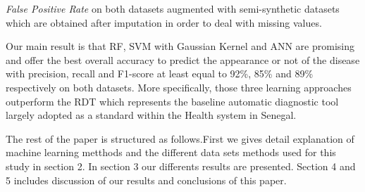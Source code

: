  \emph{False Positive Rate} on both datasets augmented with semi-synthetic datasets which are obtained after imputation in order to deal with missing values.
 
 Our main result is that RF, SVM  with Gaussian Kernel and ANN are promising and offer the best overall accuracy to predict the appearance or not of the disease with precision, recall and F1-score at least equal to 92\%, 85\% and 89\% respectively on both datasets. More specifically, those three learning approaches outperform the RDT which represents the baseline automatic diagnostic tool largely adopted as a standard within the Health system in Senegal.
 
The rest of the paper is structured as follows.First we gives detail explanation of machine learning metthods and the different data sets methods used for this study in section 2. In section 3 our  differents results are presented. Section 4 and 5 includes discussion of our results and conclusions of this paper.
 
 